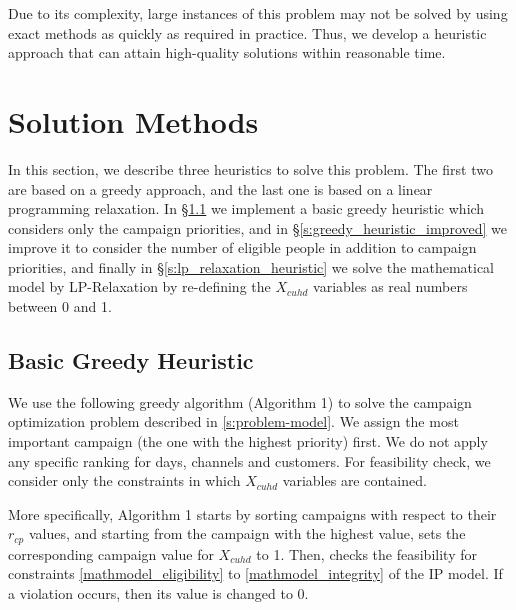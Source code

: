 \documentclass[11pt]{article}
\begin{document}
Due to its complexity, large instances of this problem may not be solved by using exact methods as quickly as required in practice. Thus, we develop a heuristic approach that can attain high-quality solutions within reasonable time.


\section{Solution Methods}  \label{s:solution-method}

In this section, we describe three heuristics to solve this problem. The first two are based on a greedy approach, and the last one is based on a linear programming relaxation. In \S \ref{s:greedy_heuristic_basic} we implement a basic greedy heuristic which considers only the campaign priorities, and in \S \ref{s:greedy_heuristic_improved} we improve it to consider the number of eligible people in addition to campaign priorities, and finally in \S \ref{s:lp_relaxation_heuristic} we solve the mathematical model by LP-Relaxation by re-defining the  $X_{{c}{u}{h}{d}}$ variables as real numbers between 0 and 1.

\subsection{Basic Greedy Heuristic} \label{s:greedy_heuristic_basic}

We use the following greedy algorithm (Algorithm 1) to solve the campaign optimization problem described in \ref{s:problem-model}. We assign  the most important campaign (the one with the highest priority) first. We do not apply any specific ranking for days, channels and customers. For feasibility check, we consider only the constraints in which $X_{{c}{u}{h}{d}}$ variables are contained.

More specifically, Algorithm 1 starts by sorting campaigns with respect to their $r_{cp}$ values, and starting from the campaign with the highest value, sets the corresponding campaign value for $X_{cuhd}$ to 1. Then, checks the feasibility for constraints \eqref{mathmodel_eligibility} to \eqref{mathmodel_integrity} of the IP model. If a violation occurs, then its value is changed to 0.  
\end{document}
